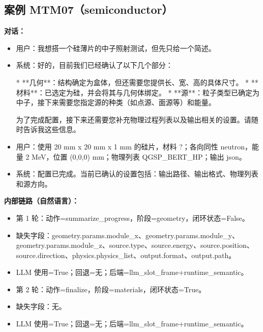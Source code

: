 \documentclass[11pt]{ctexart}
\begin{document}
\subsection{案例 MTM07（semiconductor）}
\textbf{对话：}
\begin{itemize}
\item 用户：我想搭一个硅薄片的中子照射测试，但先只给一个简述。
\item 系统：好的，目前我们已经确认了以下几个部分：

*   **几何**：结构确定为盒体，但还需要您提供长、宽、高的具体尺寸。
*   **材料**：已选定为硅，并会将其与几何体绑定。
*   **源**：粒子类型已确定为中子，接下来需要您指定源的种类（如点源、面源等）和能量。

为了完成配置，接下来还需要您补充物理过程列表以及输出相关的设置。请随时告诉我这些信息。
\item 用户：使用 20 mm x 20 mm x 1 mm 的硅片，材料 ?；各向同性 neutron，能量 2 MeV，位置 (0,0,0) mm；物理列表 QGSP\_BERT\_HP；输出 json。
\item 系统：配置已完成。当前已确认的设置包括：输出路径、输出格式、物理列表和源方向。
\end{itemize}
\textbf{内部链路（自然语言）：}
\begin{itemize}
\item 第 1 轮：动作=summarize\_progress，阶段=geometry，闭环状态=False。
\item 缺失字段：geometry.params.module\_x、geometry.params.module\_y、geometry.params.module\_z、source.type、source.energy、source.position、source.direction、physics.physics\_list、output.format、output.path。
\item LLM 使用=True；回退=无；后端=llm\_slot\_frame+runtime\_semantic。
\item 第 2 轮：动作=finalize，阶段=materials，闭环状态=True。
\item 缺失字段：无。
\item LLM 使用=True；回退=无；后端=llm\_slot\_frame+runtime\_semantic。
\end{itemize}
\end{document}
